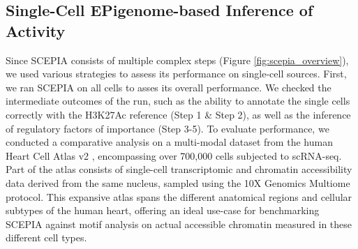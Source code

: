 \subsection{Single-Cell EPigenome-based Inference of Activity}

Since SCEPIA consists of multiple complex steps (Figure \ref{fig:scepia_overview}), we used various strategies to assess its performance on single-cell sources. First, we ran SCEPIA on all cells to asses its overall performance.  We checked the intermediate outcomes of the run, such as the ability to annotate the single cells correctly with the H3K27Ac reference (Step 1 \& Step 2), as well as the inference of regulatory factors of importance (Step 3-5). To evaluate performance, we conducted a comparative analysis on a multi-modal dataset from the human Heart Cell Atlas v2 \cite{Kanemaru2023}, encompassing over 700,000 cells subjected to scRNA-seq. Part of the atlas consists of single-cell transcriptomic and chromatin accessibility data derived from the same nucleus, sampled using the 10X Genomics Multiome protocol. This expansive atlas spans the different anatomical regions and cellular subtypes of the human heart, offering an ideal use-case for benchmarking SCEPIA against motif analysis on actual accessible chromatin measured in these different cell types. 
